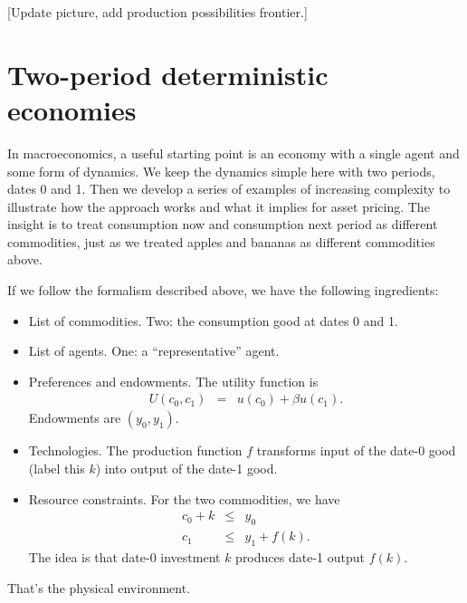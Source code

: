 \documentclass[11pt]{article}
\begin{document}
[Update picture, add production possibilities frontier.]



\section{Two-period deterministic economies}

In macroeconomics, a useful starting point is an
economy with a single agent and some form of dynamics.
We keep the dynamics simple here with two periods,
dates 0 and 1.
Then we develop a series of examples of increasing complexity
to illustrate how the approach works and what it implies for asset pricing.
The insight is to treat consumption now and consumption next period
as different commodities, just as we treated apples and bananas
as different commodities above.

If we follow the formalism described above, we have the following ingredients:
%
\begin{itemize}
\item List of commodities.  Two:  the consumption good at dates 0 and 1.
\item List of agents.  One: a ``representative'' agent.
\item Preferences and endowments.  The utility function is
\begin{eqnarray*}
    U(c_0,c_1) &=& u(c_0) + \beta u(c_1) .
\end{eqnarray*}
Endowments are $(y_0,y_1)$.
\item Technologies.  The production function $f$ transforms input of the date-0 good
(label this $k$)
into output of the date-1 good.
\item Resource constraints.  For the two commodities,
we have
\begin{eqnarray*}
    c_0 + k &\leq& y_0 \\
    c_1 &\leq&  y_1 + f(k) .
\end{eqnarray*}
The idea is that date-0 investment $k$ produces date-1 output $f(k)$.
\end{itemize}
That's the physical environment.

\end{document}
